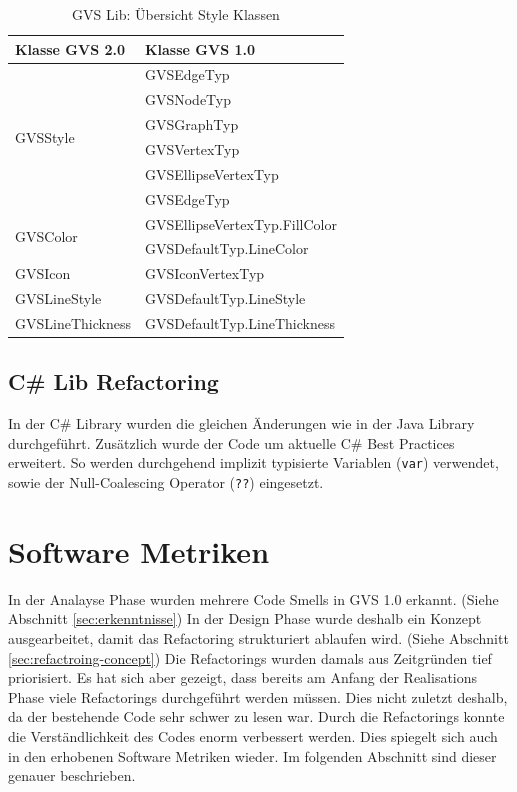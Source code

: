 \documentclass[11pt,a4paper,english,oneside]{book}
\numberwithin{equation}{chapter}
\begin{document}
	\begin{table}[h!]
		\centering
		\begin{tabularx}{\linewidth}{X X}
			\toprule 
			Klasse GVS 2.0 & Klasse GVS 1.0\\
			\midrule
			\multirow{6}{*}{GVSStyle} & 
			GVSEdgeTyp \\ & 
			GVSNodeTyp \\ & 
			GVSGraphTyp  \\ &
			GVSVertexTyp  \\ &
			GVSEllipseVertexTyp \\ &
			GVSEdgeTyp \\
			\midrule
			\multirow{2}{*}{GVSColor} & GVSEllipseVertexTyp.FillColor \\ &
			GVSDefaultTyp.LineColor \\
			\midrule
			GVSIcon & GVSIconVertexTyp \\
			\midrule
			GVSLineStyle & GVSDefaultTyp.LineStyle \\
			\midrule
			GVSLineThickness & GVSDefaultTyp.LineThickness \\
			\bottomrule 
		\end{tabularx} 
		\caption{GVS Lib: Übersicht Style Klassen} 
		\label{tbl:styles}
	\end{table}
	
	\subsection{C\# Lib Refactoring}
	In der C\# Library wurden die gleichen Änderungen wie in der Java Library durchgeführt. Zusätzlich wurde der Code um aktuelle C\# Best Practices erweitert. So werden durchgehend implizit typisierte Variablen (\lstinline|var|) verwendet, sowie der Null-Coalescing Operator (\lstinline|??|) eingesetzt. 
	
	
	\section{Software Metriken}
	In der Analayse Phase wurden mehrere Code Smells in GVS 1.0 erkannt. (Siehe Abschnitt \ref{sec:erkenntnisse}) In der Design Phase wurde deshalb ein Konzept ausgearbeitet, damit das Refactoring strukturiert ablaufen wird. (Siehe Abschnitt \ref{sec:refactroing-concept}) Die Refactorings wurden damals aus Zeitgründen tief priorisiert. Es hat sich aber gezeigt, dass bereits am Anfang der Realisations Phase viele Refactorings durchgeführt werden müssen. Dies nicht zuletzt deshalb, da der bestehende Code sehr schwer zu lesen war. Durch die Refactorings konnte die Verständlichkeit des Codes enorm verbessert werden. Dies spiegelt sich auch in den erhobenen Software Metriken wieder. Im folgenden Abschnitt sind dieser genauer beschrieben.
	
\end{document}
